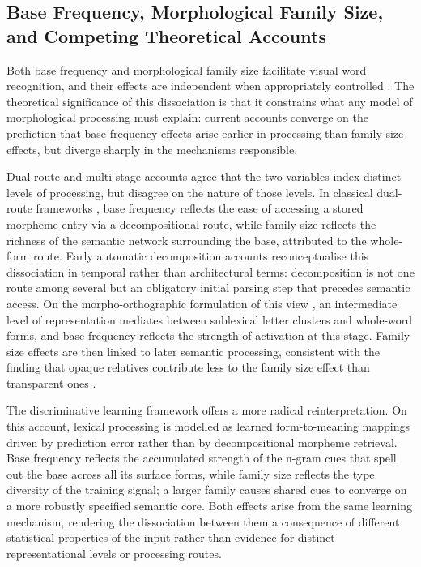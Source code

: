 \documentclass[utf8]{FrontiersinHarvard} %
\begin{document}
	
	\subsection{Base Frequency, Morphological Family Size, and Competing Theoretical Accounts}
	
	Both base frequency and morphological family size facilitate visual word recognition, and their effects are independent when appropriately controlled \citep{fordDerivationalMorphologyBase2010}. The theoretical significance of this dissociation is that it constrains what any model of morphological processing must explain: current accounts converge on the prediction that base frequency effects arise earlier in processing than family size effects, but diverge sharply in the mechanisms responsible.
	
	Dual-route and multi-stage accounts agree that the two variables index distinct levels of processing, but disagree on the nature of those levels. In classical dual-route frameworks \citep{schreuderModelingMorphologicalProcessing1995, dejongMorphologicalFamilySize2000}, base frequency reflects the ease of accessing a stored morpheme entry via a decompositional route, while family size reflects the richness of the semantic network surrounding the base, attributed to the whole-form route. Early automatic decomposition accounts \citep{taft_lexical_1975, taftMorphologicalDecompositionReverse2004} reconceptualise this dissociation in temporal rather than architectural terms: decomposition is not one route among several but an obligatory initial parsing step that precedes semantic access. On the morpho-orthographic formulation of this view \citep{rastleMorphologicalDecompositionBased2008, longtinMorphologicalDecompositionEarly2005, morrisSemanticTransparencyMasked2007}, an intermediate level of representation mediates between sublexical letter clusters and whole-word forms, and base frequency reflects the strength of activation at this stage. Family size effects are then linked to later semantic processing, consistent with the finding that opaque relatives contribute less to the family size effect than transparent ones \citep{schreuderHowComplexSimplex1997, dejongMorphologicalFamilySize2000}. 
	
	The discriminative learning framework \citep[NDL/LDL;][]{chuangDiscriminativeLearningLexicon} offers a more radical reinterpretation. On this account, lexical processing is modelled as learned form-to-meaning mappings driven by prediction error rather than by decompositional morpheme retrieval. Base frequency reflects the accumulated strength of the n-gram cues that spell out the base across all its surface forms, while family size reflects the type diversity of the training signal; a larger family causes shared cues to converge on a more robustly specified semantic core. Both effects arise from the same learning mechanism, rendering the dissociation between them a consequence of different statistical properties of the input rather than evidence for distinct representational levels or processing routes.
	
\end{document}
